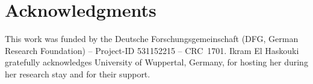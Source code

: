 \documentclass[12pt]{article}
\begin{document}
\section*{Acknowledgments}
This work was funded by the Deutsche Forschungsgemeinschaft (DFG, German
Research Foundation) – Project-ID 531152215 – CRC~1701. Ikram El Haskouki gratefully acknowledges University of Wuppertal, Germany, for hosting her during her research stay and for their support.



\end{document}
